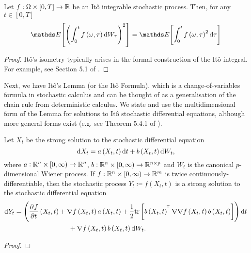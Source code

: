 \begin{theorem}[It\^o's Isometry]\label{thm:ito_isom}
	Let \(f: \Omega \times [0,T] \to \mathbb{R}\) be an It\^o integrable stochastic process.
	Then, for any \(t \in [0,T]\)
	\[
		\avg{\left(\int_0^t{f\left(\omega, \tau\right)\dif W_\tau}\right)^2} = \avg{\int_0^t{f\left(\omega, \tau\right)^2\dif\tau}}
	\]
\end{theorem}

\begin{proof}
	It\^o's isometry typically arises in the formal construction of the It\^o integral.
	For example, see Section 5.1 of \citet{KallianpurSundar_2014_StochasticAnalysisDiffusion}.
\end{proof}

Next, we have It\^o's Lemma (or the It\^o Formula), which is a change-of-variables formula in stochastic calculus and can be thought of as a generalisation of the chain rule from deterministic calculus.
We state and use the multidimensional form of the Lemma for solutions to It\^o stochastic differential equations, although more general forms exist (e.g. see Theorem 5.4.1 of \citet{KallianpurSundar_2014_StochasticAnalysisDiffusion}).

\begin{theorem}[It\^o's Lemma]\label{thm:ito_lemma}
	Let \(X_t\) be the strong solution to the stochastic differential equation
	\[
		\dif X_t = a\left(X_t, t\right)\dif t + b\left(X_t, t\right)\dif W_t,
	\]
	where \(a: \mathbb{R}^n \times [0,\infty) \to \mathbb{R}^n\), \(b: \mathbb{R}^n \times [0,\infty) \to \mathbb{R}^{n\times p}\) and \(W_t\) is the canonical \(p\)-dimensional Wiener process.
	If \(f: \mathbb{R}^n \times [0, \infty) \to \mathbb{R}^m\) is twice continuously-differentiable, then the stochastic process \(Y_t \coloneqq f\left(X_t, t\right)\) is a strong solution to the stochastic differential equation
	\begin{align*}
		\dif Y_t & = \left(\dpd{f}{t}\left(X_t, t\right) + \nabla f\left(X_t, t\right) a\left(X_t, t\right) + \frac12\mathrm{tr}\left[b\left(X_t, t\right)^{\T} \nabla\nabla f\left(X_t, t\right) b\left(X_t, t\right)\right] \right)\dif t \\
		         & \qquad\qquad\qquad\qquad + \nabla f\left(X_t, t\right)b\left(X_t, t\right) \dif W_t.
	\end{align*}
\end{theorem}

\begin{proof}

\end{proof}

